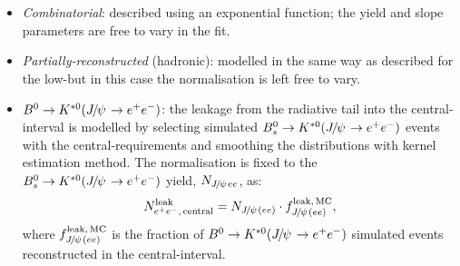 \begin{itemize}

\item \textit{Combinatorial}: described using an exponential function;
the yield and slope parameters are free to vary in the fit.

\item \textit{Partially-reconstructed} (hadronic): modelled in the same way as described for the low-\qsq but in this case
the normalisation is left free to vary.

%
%

\item $\Bz\to\Kstarz(\jpsi\to\ee)$: the leakage from the \jpsi radiative tail into the central-\qsq interval is modelled by selecting 
simulated $\Bs\to\Kstarz(\jpsi\to\ee)$ events with the central-\qsq requirements and smoothing the distributions
with kernel estimation method. The normalisation is fixed to the $\Bs\to\Kstarz(\jpsi\to\ee)$ yield, 
$N_{\jpsi ee}$, as:
%
$$N_{\ee, \, {\rm central}}^{\rm leak} = N_{\jpsi(ee)} \cdot f_{\jpsi(ee)}^{\rm leak, \,MC},$$
%
where $f_{\jpsi(ee)}^{\rm leak, \,MC}$ is the fraction of $\Bd\to\Kstarz(\jpsi\to\ee)$ simulated events reconstructed
in the central-\qsq interval.

\end{itemize}

